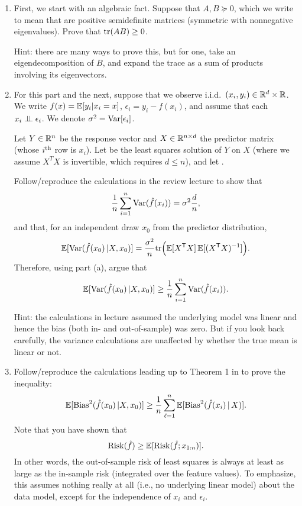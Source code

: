\documentclass{article}
\begin{document}
\begin{enumerate}[label=(\alph*)]
\item First, we start with an algebraic fact. Suppose that $A,B \succeq 0$, 
  which we write to mean that are positive semidefinite matrices (symmetric with
  nonnegative eigenvalues). Prove that $\mathrm{tr}(AB) \geq 0$. 
  \marginpar{\small [2 pts]} 

  Hint: there are many ways to prove this, but for one, take an
  eigendecomposition of $B$, and expand the trace as a sum of products involving
  its eigenvectors. 

\item For this part and the next, suppose that we observe i.i.d.\ $(x_i,y_i) \in
  \mathbb{R}^d \times \mathbb{R}$. We write $f(x) = \mathbb{E}[y_i|x_i = x]$, $\epsilon_i = y_i -
  f(x_i)$, and assume that each $x_i \perp\!\!\!\perp \epsilon_i$. We denote $\sigma^2 = 
  \mathrm{Var}[\epsilon_i]$. 

  Let $Y \in \mathbb{R}^n$ be the response vector and $X \in \mathbb{R}^{n \times d}$ the
  predictor matrix (whose $i^{\text{th}}$ row is $x_i$). Let  be the least squares solution of $Y$ on $X$ (where we 
  assume $X^T X$ is invertible, which requires $d \leq n$), and let
  .  

  Follow/reproduce the calculations in the review lecture to show that
  \marginpar{\small [3 pts]} 
  \[
  \frac{1}{n} \sum_{i=1}^n \mathrm{Var}(\hat{f}(x_i)) = \sigma^2 \frac{d}{n},
  \]
  and that, for an independent draw $x_0$ from the predictor distribution,
  \marginpar{\small [3 pts]} 
  \[
  \mathbb{E}[\mathrm{Var}(\hat{f}(x_0) \, | X, x_0)] = \frac{\sigma^2}{n} \mathrm{tr}\Big(\mathbb{E} [X^{\mathsf{T}} X] \, \mathbb{E}
  [(X^{\mathsf{T}} X)^{-1}] \Big). 
  \]
  Therefore, using part (a), argue that
  \marginpar{\small [1 pt]}
  \[
  \mathbb{E}[\mathrm{Var}(\hat{f}(x_0) \, | X, x_0)] \geq \frac{1}{n} \sum_{i=1}^n \mathrm{Var}(\hat{f}(x_i)).
  \]

  Hint: the calculations in lecture assumed the underlying model was linear and
  hence the bias (both in- and out-of-sample) was zero. But if you look back 
  carefully, the variance calculations are unaffected by whether the true mean
  is linear or not.    

\item Follow/reproduce the calculations leading up to Theorem 1 in
  \citet{rosset2020from} to prove the inequality: 
  \marginpar{\small [6 pts]} 
  \[
  \mathbb{E}[\mathrm{Bias}^2(\hat{f}(x_0) \, | X, x_0)] \geq  \frac{1}{n} \sum_{\ell=1}^n 
  \mathbb{E}[\mathrm{Bias}^2(\hat{f}(x_i) \,|\, X)].
  \]
  Note that you have shown that
  \[
  \mathrm{Risk}(\hat{f}) \geq \mathbb{E}[\mathrm{Risk}(\hat{f}; x_{1:n})].
  \]
  In other words, the out-of-sample risk of least squares is always at least as 
  large as the in-sample risk (integrated over the feature values). To
  emphasize, this assumes nothing really at all (i.e., no underlying linear
  model) about the data model, except for the independence of $x_i$ and
  $\epsilon_i$.   


\end{enumerate}
\end{document}
